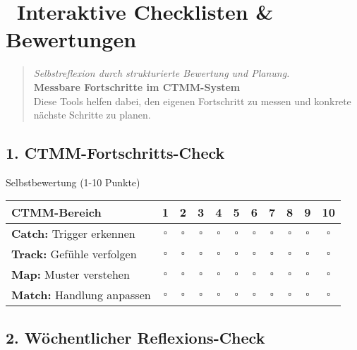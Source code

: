 
\newpage
\section*{\textcolor{ctmmOrange}{\faCheckSquare~Interaktive Checklisten \& Bewertungen}}

\begin{quote}
\textit{\textcolor{ctmmOrange}{Selbstreflexion durch strukturierte Bewertung und Planung.}}\\
\textbf{\textcolor{ctmmOrange}{Messbare Fortschritte im CTMM-System}}\\
Diese Tools helfen dabei, den eigenen Fortschritt zu messen und konkrete nächste Schritte zu planen.
\end{quote}

\subsection*{\textcolor{ctmmOrange}{1. CTMM-Fortschritts-Check}}

\begin{ctmmOrangeBox}{Selbstbewertung (1-10 Punkte)}
\begin{tabular}{|p{6cm}|c|c|c|c|c|c|c|c|c|c|}
\hline
\textbf{CTMM-Bereich} & \textbf{1} & \textbf{2} & \textbf{3} & \textbf{4} & \textbf{5} & \textbf{6} & \textbf{7} & \textbf{8} & \textbf{9} & \textbf{10} \\
\hline
\textbf{Catch:} Trigger erkennen & $\square$ & $\square$ & $\square$ & $\square$ & $\square$ & $\square$ & $\square$ & $\square$ & $\square$ & $\square$ \\
\hline
\textbf{Track:} Gefühle verfolgen & $\square$ & $\square$ & $\square$ & $\square$ & $\square$ & $\square$ & $\square$ & $\square$ & $\square$ & $\square$ \\
\hline
\textbf{Map:} Muster verstehen & $\square$ & $\square$ & $\square$ & $\square$ & $\square$ & $\square$ & $\square$ & $\square$ & $\square$ & $\square$ \\
\hline
\textbf{Match:} Handlung anpassen & $\square$ & $\square$ & $\square$ & $\square$ & $\square$ & $\square$ & $\square$ & $\square$ & $\square$ & $\square$ \\
\hline
\end{tabular}
\end{ctmmOrangeBox}

\subsection*{\textcolor{ctmmOrange}{2. Wöchentlicher Reflexions-Check}}

